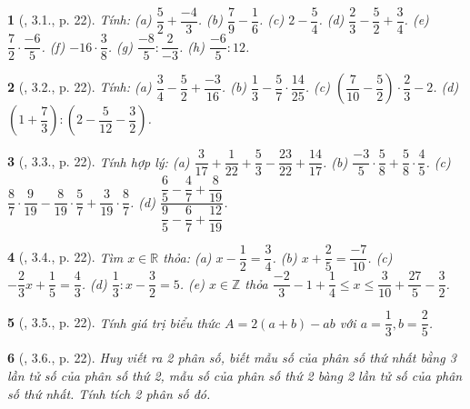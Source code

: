 \documentclass{article}
\newtheorem{baitoan}{}
\begin{document}
\begin{baitoan}[\cite{Binh_boi_duong_Toan_6_tap_2}, 3.1., p. 22]
	Tính: (a) $\dfrac{5}{2} + \dfrac{-4}{3}$. (b) $\dfrac{7}{9} - \dfrac{1}{6}$. (c) $2 - \dfrac{5}{4}$. (d) $\dfrac{2}{3} - \dfrac{5}{2} + \dfrac{3}{4}$. (e) $\dfrac{7}{2}\cdot\dfrac{-6}{5}$. (f) $-16\cdot\dfrac{3}{8}$. (g) $\dfrac{-8}{5}:\dfrac{2}{-3}$. (h) $\dfrac{-6}{5}:12$.
\end{baitoan}

\begin{baitoan}[\cite{Binh_boi_duong_Toan_6_tap_2}, 3.2., p. 22]
	Tính: (a) $\dfrac{3}{4} - \dfrac{5}{2} + \dfrac{-3}{16}$. (b) $\dfrac{1}{3} - \dfrac{5}{7}\cdot\dfrac{14}{25}$. (c) $\left(\dfrac{7}{10} - \dfrac{5}{2}\right)\cdot\dfrac{2}{3} - 2$. (d) $\left(1 + \dfrac{7}{3}\right):\left(2 - \dfrac{5}{12} - \dfrac{3}{2}\right)$.
\end{baitoan}

\begin{baitoan}[\cite{Binh_boi_duong_Toan_6_tap_2}, 3.3., p. 22]
	Tính hợp lý: (a) $\dfrac{3}{17} + \dfrac{1}{22} + \dfrac{5}{3} - \dfrac{23}{22} + \dfrac{14}{17}$. (b) $\dfrac{-3}{5}\cdot\dfrac{5}{8} + \dfrac{5}{8}\cdot\dfrac{4}{5}$. (c) $\dfrac{8}{7}\cdot\dfrac{9}{19} - \dfrac{8}{19}\cdot\dfrac{5}{7} + \dfrac{3}{19}\cdot\dfrac{8}{7}$. (d) $\dfrac{\dfrac{6}{5} - \dfrac{4}{7} + \dfrac{8}{19}}{\dfrac{9}{5} - \dfrac{6}{7} + \dfrac{12}{19}}$.
\end{baitoan}

\begin{baitoan}[\cite{Binh_boi_duong_Toan_6_tap_2}, 3.4., p. 22]
	Tìm $x\in\mathbb{R}$ thỏa: (a) $x - \dfrac{1}{2} = \dfrac{3}{4}$. (b) $x + \dfrac{2}{5} = \dfrac{-7}{10}$. (c) $-\dfrac{2}{3}x + \dfrac{1}{5} = \dfrac{4}{3}$. (d) $\dfrac{1}{3}:x - \dfrac{3}{2} = 5$. (e) $x\in\mathbb{Z}$ thỏa $\dfrac{-2}{3} - 1 + \dfrac{1}{4}\le x\le\dfrac{3}{10} + \dfrac{27}{5} - \dfrac{3}{2}$.
\end{baitoan}

\begin{baitoan}[\cite{Binh_boi_duong_Toan_6_tap_2}, 3.5., p. 22]
	Tính giá trị biểu thức $A = 2(a + b) - ab$ với $a = \dfrac{1}{3},b = \dfrac{2}{5}$.
\end{baitoan}

\begin{baitoan}[\cite{Binh_boi_duong_Toan_6_tap_2}, 3.6., p. 22]
	Huy viết ra 2 phân số, biết mẫu số của phân số thứ nhất bằng 3 lần tử số của phân số thứ 2, mẫu số của phân số thứ 2 bàng 2 lần tử số của phân số thứ nhất. Tính tích 2 phân số đó.
\end{baitoan}
\end{document}
